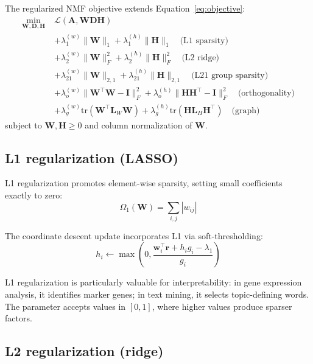 \documentclass[article]{jss_modified}
\begin{document}
The regularized NMF objective extends Equation~\ref{eq:objective}:
\begin{align}
  \min_{\mathbf{W}, \mathbf{D}, \mathbf{H}} \;
  &\mathcal{L}(\mathbf{A}, \mathbf{WDH}) \nonumber \\
  &+ \lambda_1^{(w)} \|\mathbf{W}\|_1 + \lambda_1^{(h)} \|\mathbf{H}\|_1 
  \quad \text{(L1 sparsity)} \nonumber \\
  &+ \lambda_2^{(w)} \|\mathbf{W}\|_F^2 + \lambda_2^{(h)} \|\mathbf{H}\|_F^2 
  \quad \text{(L2 ridge)} \nonumber \\
  &+ \lambda_{21}^{(w)} \|\mathbf{W}\|_{2,1} + \lambda_{21}^{(h)} \|\mathbf{H}\|_{2,1} 
  \quad \text{(L21 group sparsity)} \nonumber \\
  &+ \lambda_o^{(w)} \|\mathbf{W}^\top\mathbf{W} - \mathbf{I}\|_F^2 + 
     \lambda_o^{(h)} \|\mathbf{H}\mathbf{H}^\top - \mathbf{I}\|_F^2 
  \quad \text{(orthogonality)} \nonumber \\
  &+ \lambda_g^{(w)} \text{tr}(\mathbf{W}^\top\mathbf{L}_W\mathbf{W}) + 
     \lambda_g^{(h)} \text{tr}(\mathbf{H}\mathbf{L}_H\mathbf{H}^\top) 
  \quad \text{(graph)}
  \label{eq:regularized}
\end{align}
subject to $\mathbf{W}, \mathbf{H} \geq 0$ and column normalization of 
$\mathbf{W}$.

\subsection{L1 regularization (LASSO)}

L1 regularization promotes element-wise sparsity, setting small coefficients 
exactly to zero:
\begin{equation}
  \Omega_1(\mathbf{W}) = \sum_{i,j} |w_{ij}|
\end{equation}

The coordinate descent update incorporates L1 via soft-thresholding:
\begin{equation}
  h_i \leftarrow \max\left(0, \frac{\mathbf{w}_i^\top\mathbf{r} + h_i g_i - 
  \lambda_1}{g_i}\right)
\end{equation}

L1 regularization is particularly valuable for interpretability: in gene 
expression analysis, it identifies marker genes; in text mining, it selects 
topic-defining words. The  parameter accepts values in $[0, 1]$, where 
higher values produce sparser factors.

\subsection{L2 regularization (ridge)}
\end{document}
